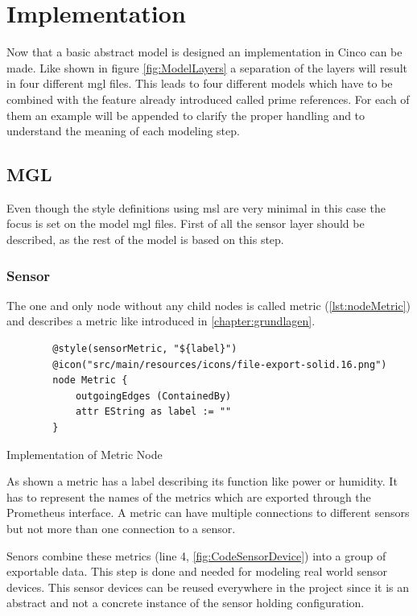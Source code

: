 \chapter{Implementation}
\label{chapter:realisierung}
Now that a basic abstract model is designed an implementation in Cinco can be made. Like shown in figure \ref{fig:ModelLayers} a separation of the layers will result in four different \gls{mgl} files. This leads to four different models which have to be combined with the feature already introduced called prime references. For each of them an example will be appended to clarify the proper handling and to understand the meaning of each modeling step.

\section{MGL}
\label{sec:mgl}
Even though the style definitions using \gls{msl} are very minimal in this case the focus is set on the model \gls{mgl} files.
First of all the sensor layer should be described, as the rest of the model is based on this step.
\subsection{Sensor}
The one and only node without any child nodes is called metric (\cref{lst:nodeMetric}) and describes a metric like introduced in \cref{chapter:grundlagen}. 
\begin{listing}[H]
	\begin{verbatim}
		@style(sensorMetric, "${label}")
		@icon("src/main/resources/icons/file-export-solid.16.png")
		node Metric {
			outgoingEdges (ContainedBy)
			attr EString as label := ""
		}
	\end{verbatim}
	\caption{Implementation of Metric Node}
	\label{lst:nodeMetric}
\end{listing}
As shown a metric has a label describing its function like power or humidity. It has to represent the names of the metrics which are exported through the Prometheus interface. A metric can have multiple connections to different sensors but not more than one connection to a sensor.

Senors combine these metrics (line 4, \cref{fig:CodeSensorDevice}) into a group of exportable data. This step is done and needed for modeling real world sensor devices. This sensor devices can be reused everywhere in the project since it is an abstract and not a concrete instance of the sensor holding configuration. 


